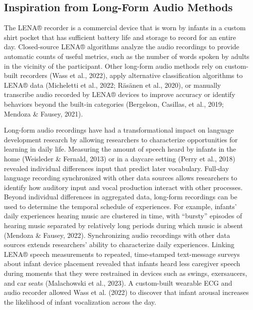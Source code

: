 \documentclass[
  man]{apa6}
\begin{document}
\hypertarget{inspiration-from-long-form-audio-methods}{%
\subsection{Inspiration from Long-Form Audio Methods}\label{inspiration-from-long-form-audio-methods}}

The LENA® recorder is a commercial device that is worn by infants in a custom shirt pocket that has sufficient battery life and storage to record for an entire day. Closed-source LENA® algorithms analyze the audio recordings to provide automatic counts of useful metrics, such as the number of words spoken by adults in the vicinity of the participant. Other long-form audio methods rely on custom-built recorders (Wass et al., 2022), apply alternative classification algorithms to LENA® data (Micheletti et al., 2022; Räsänen et al., 2020), or manually transcribe audio recorded by LENA® devices to improve accuracy or identify behaviors beyond the built-in categories (Bergelson, Casillas, et al., 2019; Mendoza \& Fausey, 2021).

Long-form audio recordings have had a transformational impact on language development research by allowing researchers to characterize opportunities for learning in daily life. Measuring the amount of speech heard by infants in the home (Weisleder \& Fernald, 2013) or in a daycare setting (Perry et al., 2018) revealed individual differences input that predict later vocabulary. Full-day language recording synchronized with other data sources allows researchers to identify how auditory input and vocal production interact with other processes. Beyond individual differences in aggregated data, long-form recordings can be used to determine the temporal schedule of experiences. For example, infants' daily experiences hearing music are clustered in time, with ``bursty'' episodes of hearing music separated by relatively long periods during which music is absent (Mendoza \& Fausey, 2022). Synchronizing audio recordings with other data sources extends researchers' ability to characterize daily experiences. Linking LENA® speech measurements to repeated, time-stamped text-message surveys about infant device placement revealed that infants heard less caregiver speech during moments that they were restrained in devices such as swings, exersaucers, and car seats (Malachowski et al., 2023). A custom-built wearable ECG and audio recorder allowed Wass et al. (2022) to discover that infant arousal increases the likelihood of infant vocalization across the day.
\end{document}
